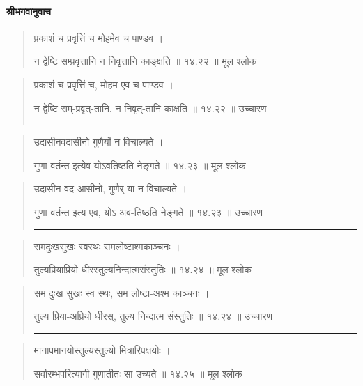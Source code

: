 \paragraph{\sanskrit श्रीभगवानुवाच}
\begin{quotation} 
प्रकाशं च प्रवृत्तिं च मोहमेव च पाण्डव  ।  

न द्वेष्टि सम्प्रवृत्तानि न निवृत्तानि काङ्‍क्षति  ॥ १४.२२ ॥  मूल श्लोक
\end{quotation}

\begin{quotation}

प्रकाशं च प्रवृत्तिं च, मोहम एव च पाण्डव  ।  

न द्वेष्टि सम्-प्रवृत्-तानि, न निवृत्-तानि कांक्षति  ॥ १४.२२ ॥  उच्चारण

\noindent\rule{16cm}{0.4pt} 
\end{quotation}


\begin{quotation}

उदासीनवदासीनो गुणैर्यो न विचाल्यते  ।  

गुणा वर्तन्त इत्येव योऽवतिष्ठति नेङ्‍गते  ॥ १४.२३ ॥  मूल श्लोक
\end{quotation}

\begin{quotation}

उदासीन-वद आसीनो, गुणैर् या न विचाल्यते  ।  

गुणा वर्तन्त इत्य एव, योऽ अव-तिष्ठति नेङ्‍गते  ॥ १४.२३ ॥  उच्चारण

\noindent\rule{16cm}{0.4pt} 
\end{quotation}


\begin{quotation}

समदुःखसुखः स्वस्थः समलोष्टाश्मकाञ्चनः  ।  

तुल्यप्रियाप्रियो धीरस्तुल्यनिन्दात्मसंस्तुतिः  ॥ १४.२४ ॥  मूल श्लोक
\end{quotation}

\begin{quotation}

सम दुःख सुखः स्व स्थः, सम लोष्टा-अश्म काञ्चनः  ।  

तुल्य प्रिया-अप्रियो धीरस्, तुल्य निन्दात्म संस्तुतिः  ॥ १४.२४ ॥  उच्चारण

\noindent\rule{16cm}{0.4pt} 
\end{quotation}


\begin{quotation}

मानापमानयोस्तुल्यस्तुल्यो मित्रारिपक्षयोः  ।  

सर्वारम्भपरित्यागी गुणातीतः सा उच्यते  ॥ १४.२५ ॥  मूल श्लोक
\end{quotation}

